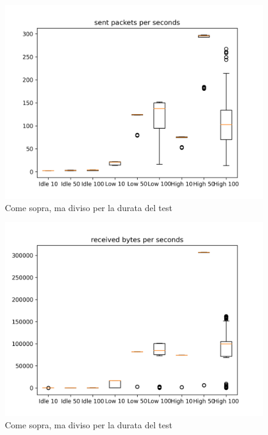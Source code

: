 \documentclass[12pt, a4paper]{article}
\begin{document}
\begin{figure}[H]
    \includegraphics[width=\linewidth, height=0.4\textheight, keepaspectratio]{graphs/sent packets per seconds.png}
    \caption{Come sopra, ma diviso per la durata del test}
    \label{fig:spps}
\end{figure}

\begin{figure}[H]
    \includegraphics[width=\linewidth, height=0.4\textheight, keepaspectratio]{graphs/received bytes per seconds.png}
    \caption{Come sopra, ma diviso per la durata del test}
    \label{fig:rbps}
\end{figure}
\end{document}
